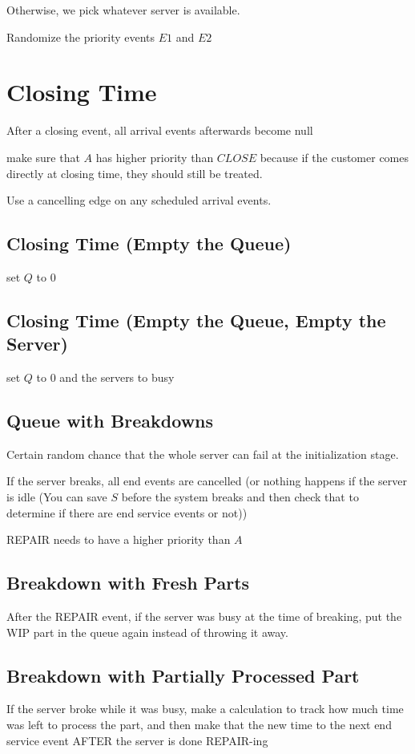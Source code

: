 \documentclass[fleqn]{report}
\begin{document}
Otherwise, we pick whatever server is available. 

Randomize the priority events $E1$ and $E2$

\section{Closing Time}
After a closing event, all arrival events afterwards become null 

make sure that $A$ has higher priority than $CLOSE$ because if the 
customer comes directly at closing time, they should still 
be treated.

Use a cancelling edge on any scheduled arrival events. 

\subsection{Closing Time (Empty the Queue)}
set $Q$ to 0

\subsection{Closing Time (Empty the Queue, Empty the Server)}
set $Q$ to 0 and the servers to busy 

\subsection{Queue with Breakdowns}
Certain random chance that the whole server can fail 
at the initialization stage. 

If the server breaks, all end events are cancelled (or nothing 
happens if the server is idle (You can save $S$ before the system 
breaks and then check that to determine if there are end service events 
or not))

REPAIR needs to have a higher priority than $A$ 

\subsection{Breakdown with Fresh Parts}
After the REPAIR event, if the server was busy at the time 
of breaking, put the WIP part in the queue again instead of throwing 
it away. 

\subsection{Breakdown with Partially Processed Part}
If the server broke while it was busy, 
make a calculation to track how much time was left to process the part, 
and then make that the new time to the next end service event AFTER 
the server is done REPAIR-ing 
\end{document}
